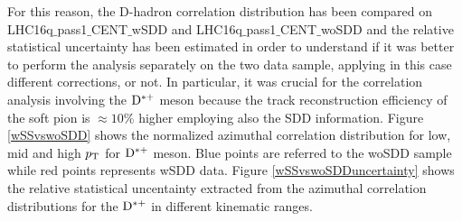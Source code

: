 For this reason, the D-hadron correlation distribution has been compared on LHC16q$\_$pass1$\_$CENT$\_$wSDD and LHC16q$\_$pass1$\_$CENT$\_$woSDD and the relative statistical uncertainty has been estimated in order to understand if it was better to perform the analysis separately on the two data sample, applying in this case different corrections, or not.
In particular, it was crucial for the correlation analysis involving the ${\rm D^{*+}}$ meson because the track reconstruction efficiency of the soft pion is $\approx 10\%$ higher employing also the SDD information.
Figure \ref{wSSvswoSDD} shows the normalized azimuthal correlation distribution for low, mid and high $p_{\rm T}$ for ${\rm D^{*+}}$ meson. Blue points are referred to the woSDD sample while red points represents wSDD data. Figure \ref{wSSvswoSDDuncertainty} shows the relative statistical uncentainty extracted from the azimuthal correlation distributions for the ${\rm D^{*+}}$ in different kinematic ranges.

